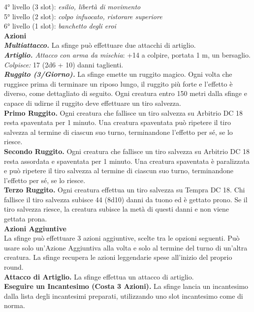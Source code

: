\begin{multicols}{2}
4° livello (3 slot): \emph{esilio, libertà di movimento}\\
5° livello (2 slot): \emph{colpo infuocato, ristorare superiore}\\
6° livello (1 slot): \emph{banchetto degli eroi}\\
\smallskip\textbf{Azioni}\\
\emph{\textbf{Multiattacco.}} La sfinge può effettuare due attacchi di artiglio.\\
\emph{\textbf{Artiglio.} Attacco con arma da mischia}: +14 a colpire, portata 1 m, un bersaglio.\\
\emph{Colpisce:} 17 (2d6 + 10) danni taglienti.\\
\emph{\textbf{Ruggito (3/Giorno).}} La sfinge emette un ruggito magico. Ogni volta che ruggisce prima di terminare un riposo lungo, il ruggito più forte e l'effetto è diverso, come dettagliato di seguito. Ogni creatura entro 150 metri dalla sfinge e capace di udirne il ruggito deve effettuare un tiro salvezza.\\
\textbf{Primo Ruggito.} Ogni creatura che fallisce un tiro salvezza su Arbitrio DC 18 resta spaventata per 1 minuto. Una creatura spaventata può ripetere il tiro salvezza al termine di ciascun suo turno, terminandone l'effetto per sé, se lo riesce.\\
\textbf{Secondo Ruggito.} Ogni creatura che fallisce un tiro salvezza su Arbitrio DC 18 resta assordata e spaventata per 1 minuto. Una creatura spaventata è paralizzata e può ripetere il tiro salvezza al termine di ciascun suo turno, terminandone l'effetto per sé, se lo riesce.\\
\textbf{Terzo Ruggito.} Ogni creatura effettua un tiro salvezza su Tempra DC 18. Chi fallisce il tiro salvezza subisce 44 (8d10) danni da tuono ed è gettato prono. Se il tiro salvezza riesce, la
creatura subisce la metà di questi danni e non viene gettata prona.\\
\textbf{Azioni Aggiuntive}\\
La sfinge può effettuare 3 azioni aggiuntive, scelte tra le opzioni seguenti. Può usare solo un'Azione Aggiuntiva alla volta e solo al termine del turno di un'altra creatura. La sfinge recupera le azioni leggendarie spese all'inizio del proprio round.\\
\textbf{Attacco di Artiglio.} La sfinge effettua un attacco di artiglio. \\
\textbf{Eseguire un Incantesimo (Costa 3 Azioni).} La sfinge lancia un incantesimo dalla lista degli incantesimi preparati, utilizzando uno slot incantesimo come di norma.\\

\end{multicols}
